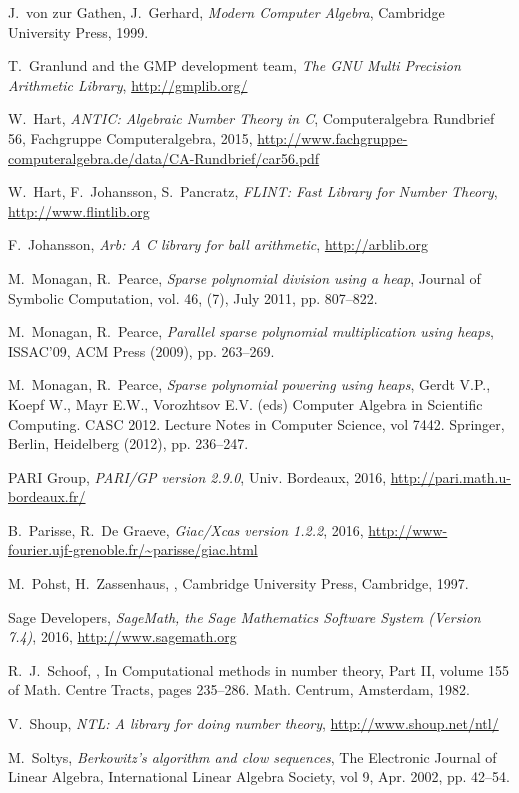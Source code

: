 \documentclass{sig-alternate-05-2015}
\begin{document}
\begin{thebibliography}{99}
J.~von zur Gathen, J.~Gerhard, {\em Modern Computer Algebra}, Cambridge University Press, 1999.

T.~Granlund and the GMP development team, {\em The GNU Multi Precision Arithmetic 
Library}, \url{http://gmplib.org/}

W.~Hart, {\em ANTIC: Algebraic Number Theory in C}, Computeralgebra Rundbrief 56, Fachgruppe Computeralgebra, 2015, \url{http://www.fachgruppe-computeralgebra.de/data/CA-Rundbrief/car56.pdf}

W.~Hart, F.~Johansson, S.~Pancratz, {\em FLINT: Fast Library for Number Theory}, \url{http://www.flintlib.org}

F.~Johansson, {\em Arb: A C library for ball arithmetic}, \url{http://arblib.org}

M.~Monagan, R.~Pearce, {\em Sparse polynomial division using a heap}, Journal of Symbolic Computation, vol. 46, (7), July 2011, pp. 807--822.

M.~Monagan, R.~Pearce, {\em Parallel sparse polynomial multiplication using heaps}, ISSAC'09, ACM Press (2009), pp. 263--269.

M.~Monagan, R.~Pearce, {\em Sparse polynomial powering using heaps}, Gerdt V.P., Koepf W., Mayr E.W., Vorozhtsov E.V. (eds) Computer Algebra in Scientific Computing. CASC 2012. Lecture Notes in Computer Science, vol 7442. Springer, Berlin, Heidelberg (2012), pp. 236--247.

PARI Group, {\em PARI/GP version 2.9.0}, Univ. Bordeaux, 2016, \url{http://pari.math.u-bordeaux.fr/}

B.~Parisse, R.~De Graeve, {\em Giac/Xcas version 1.2.2}, 2016, \url{http://www-fourier.ujf-grenoble.fr/~parisse/giac.html}

M.~Pohst, H.~Zassenhaus,
,
\newblock Cambridge University Press, Cambridge, 1997.

Sage Developers, {\em SageMath, the Sage Mathematics Software System (Version 7.4)}, 2016,  \url{http://www.sagemath.org}

R.~J.~Schoof,
,
\newblock In Computational methods in number theory, {P}art {II}, volume
  155 of Math. Centre Tracts, pages 235--286. Math. Centrum, Amsterdam,
  1982.

V.~Shoup, {\em NTL: A library for doing number theory}, \url{http://www.shoup.net/ntl/}

M.~Soltys, {\em Berkowitz's algorithm and clow sequences}, The Electronic Journal of Linear Algebra, International Linear Algebra Society, vol 9, Apr. 2002, pp. 42--54.

%
%
\end{thebibliography}
\end{document}
